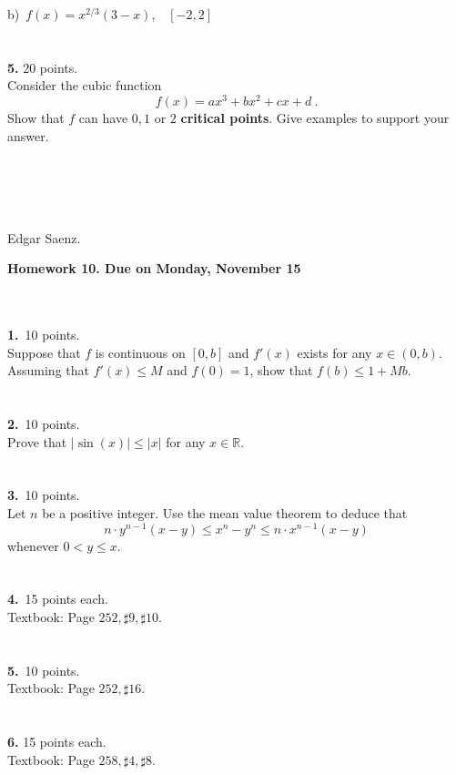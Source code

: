 \documentclass[12pt]{article}
\begin{document}
b)\ $f(x)=x^{2/3}(3-x)$,\ \ $[-2,2]$\\
\\
\\
\textbf{5.} 20 points.\\
Consider the cubic function $$f(x)=ax^{3}+bx^{2}+cx+d\ .$$ Show that
$f$ can have $0,1$ or $2$ \textbf{critical points}. Give examples to
support your answer.
\\\\\\\\\\
\begin{flushright}
Edgar Saenz.
\end{flushright}
\newpage
\begin{center}
\textbf{Homework 10. Due on Monday, November 15} \\
\end{center}\
\\
\\
\textbf{1.}\ 10 points.\\
Suppose that $f$ is continuous on $[0,b]$ and $f'(x)$ exists for any
$x\in(0,b)$. Assuming that $f'(x)\leq M$ and
$f(0)=1$, show that $f(b)\leq 1+Mb$.\\
\\
\\
\textbf{2.}\ 10 points.\\
Prove that $|\sin(x)|\leq |x|$ for any $x\in\mathbb{R}$.\\
\\
\\
\textbf{3.}\ 10 points.\\
Let $n$ be a positive integer. Use the mean value theorem to deduce
that
$$n\cdot y^{n-1}(x-y)\leq x^{n}-y^{n}\leq n\cdot x^{n-1}(x-y)$$
whenever $0<y\leq x$.\\
\\
\\
\textbf{4.}\ 15 points each.\\
Textbook: Page $252, \sharp9, \sharp10$.\\\\\\
\textbf{5.}\ 10 points.\\
Textbook: Page $252, \sharp16$.\\\\\\
\textbf{6.} 15 points each.\\
Textbook: Page $258, \sharp4, \sharp8$.\\\\\\
\end{document}
